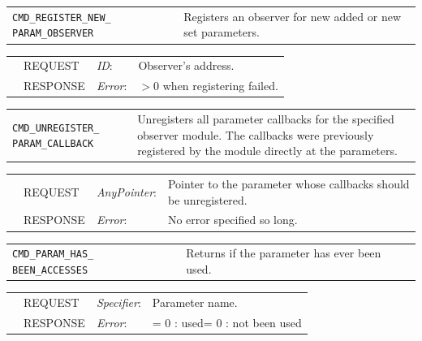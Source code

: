 \vspace{1 cm}

\noindent
\begin{tabularx}{\textwidth}{|p{4cm}|X|}
	\cline{1-1}\cline{2-2}
	  \lstinline|CMD_REGISTER_NEW_ PARAM_OBSERVER| & Registers an observer for new added or new set parameters.  \\
\end{tabularx}
\begin{tabularx}{\textwidth}{|p{4cm}|p{2.3cm}|p{2cm}|X|}
	\cline{1-1}\cline{2-2}\cline{3-3}\cline{4-4}
	 &  REQUEST     &  {\em ID}:    &  Observer's address.   \\
	\cline{1-1}\cline{2-2}\cline{3-3}\cline{4-4}                                      &  RESPONSE    &  {\em Error}:        &  $>0$ when registering failed.  \\
	\hline
\end{tabularx}

\vspace{1 cm}

\noindent
\begin{tabularx}{\textwidth}{|p{4cm}|X|}
	\cline{1-1}\cline{2-2}
	  \lstinline|CMD_UNREGISTER_ PARAM_CALLBACK| & Unregisters all parameter callbacks for the specified observer module. The callbacks were previously registered by the module directly at the parameters.\\
\end{tabularx}
\begin{tabularx}{\textwidth}{|p{4cm}|p{2.3cm}|p{2cm}|X|}
	\cline{1-1}\cline{2-2}\cline{3-3}\cline{4-4}
	 &  REQUEST     &  {\em AnyPointer}:    &  Pointer to the parameter whose callbacks should be unregistered.   \\
	\cline{1-1}\cline{2-2}\cline{3-3}\cline{4-4}                                      &  RESPONSE    &  {\em Error}:        &  No error specified so long.  \\
	\hline
\end{tabularx}

\vspace{1 cm}

\noindent
\begin{tabularx}{\textwidth}{|p{4cm}|X|}
	\cline{1-1}\cline{2-2}
	  \lstinline|CMD_PARAM_HAS_ BEEN_ACCESSES| & Returns if the parameter has ever been used.\\
\end{tabularx}
\begin{tabularx}{\textwidth}{|p{4cm}|p{2.3cm}|p{2cm}|X|}
	\cline{1-1}\cline{2-2}\cline{3-3}\cline{4-4}
	 &  REQUEST     &  {\em Specifier}:    &  Parameter name.   \\
	\cline{1-1}\cline{2-2}\cline{3-3}\cline{4-4}                                      &  RESPONSE    &  {\em Error}:        &  = 0 : used\newline = 0 : not been used  \\
	\hline
\end{tabularx}


